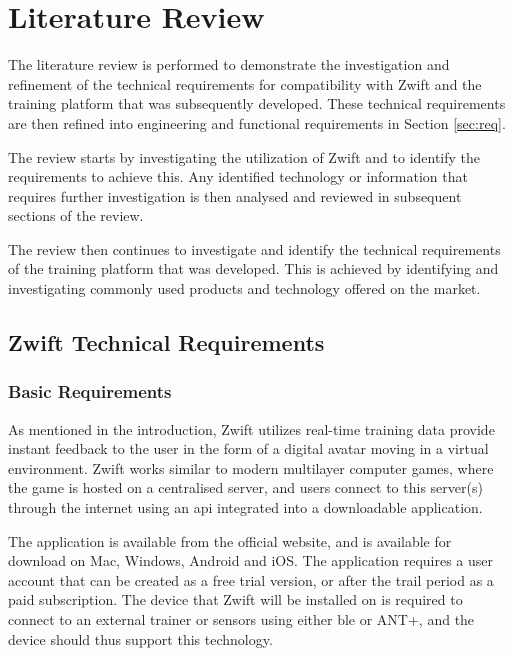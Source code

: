 
\chapter{Literature Review}
\label{sec:lit}


The literature review is performed to demonstrate the investigation and refinement of the technical requirements for compatibility with Zwift and the training platform that was subsequently developed. These technical requirements are then refined into engineering and functional requirements in Section \ref{sec:req}.

The review starts by investigating the utilization of Zwift and to identify the requirements to achieve this. Any identified technology or information that requires further investigation is then analysed and reviewed in subsequent sections of the review.

The review then continues to investigate and identify the technical requirements of the training platform that was developed. This is achieved by identifying and investigating commonly used products and technology offered on the market.

\section{Zwift Technical Requirements}

\subsection{Basic Requirements}
As mentioned in the introduction, Zwift utilizes real-time training data provide instant feedback to the user in the form of a digital avatar moving in a virtual environment. Zwift works similar to modern multilayer computer games, where the game is hosted on a centralised server, and users connect to this server(s) through the internet using an \ac{api} integrated into a downloadable application.

The application is available from the official website, and is available for download on Mac, Windows, Android and iOS. The application requires a user account that can be created as a free trial version, or after the trail period as a paid subscription. The device that Zwift will be installed on is required to connect to an external trainer or sensors using either \acs{ble} or ANT+, and the device should thus support this technology. \citep{Zwift:2022}

